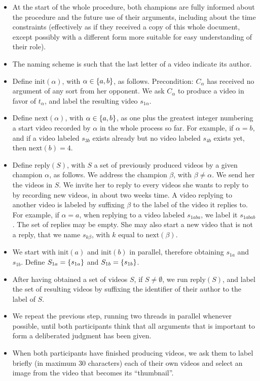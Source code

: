\documentclass[version=3.21, pagesize, twoside=off, bibliography=totoc, DIV=calc, fontsize=12pt, a4paper]{scrartcl}
\begin{document}
\begin{itemize}
	\item At the start of the whole procedure, both champions are fully informed about the procedure and the future use of their arguments, including about the time constraints (effectively as if they received a copy of this whole document, except possibly with a different form more suitable for easy understanding of their role).
	\item The naming scheme is such that the last letter of a video indicate its author.
	\item Define $\text{init}(\alpha)$, with $\alpha \in \{a, b\}$, as follows. Precondition: $C_\alpha$ has received no argument of any sort from her opponent. We ask $C_\alpha$ to produce a video in favor of $t_\alpha$, and label the resulting video $s_{1 \alpha}$.
	\item Define $\text{next}(\alpha)$, with $\alpha \in \{a, b\}$, as one plus the greatest integer numbering a start video recorded by $\alpha$ in the whole process so far. For example, if $\alpha = b$, and if a video labeled $s_{3b}$ exists already but no video labeled $s_{4b}$ exists yet, then $\text{next}(b) = 4$.
	\item Define $\text{reply}(S)$, with $S$ a set of previously produced videos by a given champion $\alpha$, as follows. We address the champion $\beta$, with $\beta ≠ \alpha$. We send her the videos in $S$. We invite her to reply to every videos she wants to reply to by recording new videos, in about two weeks time. A video replying to another video is labeled by suffixing $\beta$ to the label of the video it replies to. For example, if $\alpha = a$, when replying to a video labeled $s_{1aba}$, we label it $s_{1abab}$. The set of replies may be empty. She may also start a new video that is not a reply, that we name $s_{k\beta}$, with $k$ equal to $\text{next}(\beta)$.
	\item We start with $\text{init}(a)$ and $\text{init}(b)$ in parallel, therefore obtaining $s_{1a}$ and $s_{1b}$. Define $S_{1a} = \{s_{1a}\}$ and $S_{1b} = \{s_{1b}\}$.
	\item After having obtained a set of videos $S$, if $S ≠ \emptyset$, we run $\text{reply}(S)$, and label the set of resulting videos by suffixing the identifier of their author to the label of $S$. 
	\item We repeat the previous step, running two threads in parallel whenever possible, until both participants think that all arguments that is important to form a deliberated judgment has been given.
	\item When both participants have finished producing videos, we ask them to label briefly (in maximum 30 characters) each of their own videos and select an image from the video that becomes its “thumbnail”.
\end{itemize}
\end{document}
